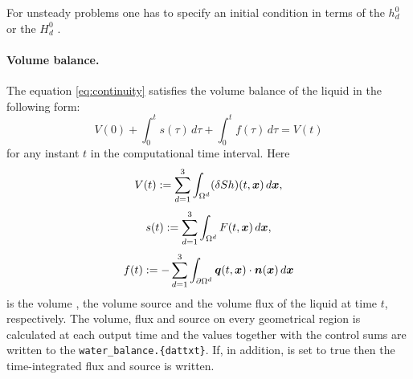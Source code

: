 For unsteady problems one has to specify an initial condition in terms of the 
$h_d^0$ 
or the 
$H_d^0$ .

\paragraph{Volume balance.}
The equation \eqref{eq:continuity} satisfies the volume balance of the liquid in the following form:
\[ V(0) + \int_0^t s(\tau) \,d\tau + \int_0^t f(\tau) \,d\tau = V(t) \]
for any instant $t$ in the computational time interval.
Here
$$ V(t) := \sum_{d=1}^3\int_{\Omega^d}(\delta S h)(t,\mathbf{\boldsymbol{x}})\,d\mathbf{\boldsymbol{x}}, $$
$$ s(t) := \sum_{d=1}^3\int_{\Omega^d}F(t,\mathbf{\boldsymbol{x}})\,d\mathbf{\boldsymbol{x}}, $$
$$ f(t) := -\sum_{d=1}^3\int_{\partial\Omega^d}\mathbf{\boldsymbol{q}}(t,\mathbf{\boldsymbol{x}})\cdot\mathbf{\boldsymbol{n}}(\mathbf{\boldsymbol{x}}) \,d\mathbf{\boldsymbol{x}} $$
is the volume , the volume source  and the volume flux  of the liquid at time $t$, respectively.
The volume, flux and source on every geometrical region is calculated at each output time and the values together with the control sums are written to the  \texttt{water\_balance.\{dat\textbar txt\}}.
If, in addition,  is set to true then the time-integrated flux and source is written.




